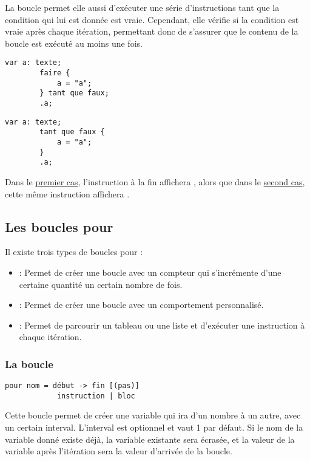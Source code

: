 \documentclass[../userguide.tex]{subfiles}
\begin{document}
    La boucle  permet elle aussi d'exécuter une série d'instructions tant que la condition qui lui
    est donnée est vraie.
    Cependant, elle vérifie si la condition est vraie après chaque itération, permettant donc de s'assurer que le
    contenu de la boucle est exécuté au moins une fois.

    \begin{lstlisting}[label=lst:boucle-ex-2]
        var a: texte;
        faire {
            a = "a";
        } tant que faux;
        .a;
    \end{lstlisting}
    \begin{lstlisting}[label=lst:boucle-ex-3]
        var a: texte;
        tant que faux {
            a = "a";
        }
        .a;
    \end{lstlisting}

    Dans le \hyperref[lst:boucle-ex-2]{premier cas}, l'instruction  à la fin affichera , alors que dans
    le \hyperref[lst:boucle-ex-3]{second cas}, cette même instruction affichera .

    \subsection{Les boucles pour}\label{subsec:les-boucles-pour}
    \parindent
    Il existe trois types de boucles pour :
    \begin{itemize}
        \item {} : Permet de créer une boucle avec un compteur qui s'incrémente d'une certaine quantité un
        certain nombre de fois.
        \item {} : Permet de créer une boucle  avec un comportement personnalisé.
        \item {} : Permet de parcourir un tableau ou une liste et d'exécuter une instruction à chaque
        itération.
    \end{itemize}

    \subsubsection{La boucle }
    \parindent
    \begin{lstlisting}[label=lst:boucle-pour-syntaxe]
        pour nom = début -> fin [(pas)]
            instruction | bloc
    \end{lstlisting}
    \divider

    Cette boucle permet de créer une variable qui ira d'un nombre à un autre, avec un certain interval.
    L'interval est optionnel et vaut 1 par défaut.
    Si le nom de la variable donné existe déjà, la variable existante sera écrasée, et la valeur de la variable après
    l'itération sera la valeur d'arrivée de la boucle.
\end{document}
